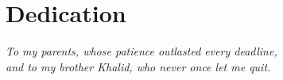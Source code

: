 \chapter*{Dedication}
\thispagestyle{empty}
\vspace{60pt}
\begin{center}
\itshape
To my parents, whose patience outlasted every deadline,\\{}
and to my brother Khalid, who never once let me quit.
\end{center}

